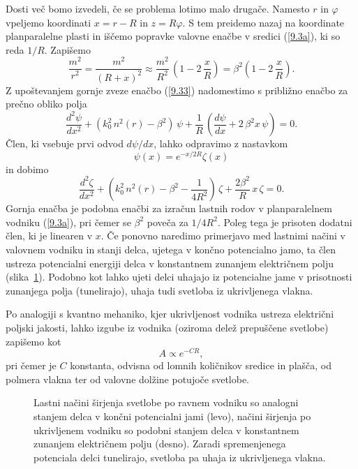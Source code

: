 Dosti več bomo izvedeli, če se problema lotimo malo drugače. Namesto $r$
in $\varphi$ vpeljemo koordinati $x=r-R$ in $z=R\varphi$.
S tem preidemo nazaj na koordinate planparalelne plasti in iščemo popravke valovne
enačbe v sredici (\ref{9.3a}), ki so reda $1/R.$ Zapišemo
\begin{equation}
\frac{m^{2}}{r^{2}}=\frac{m^{2}}{\left(R+x\right)^{2}}\approx\frac{m^{2}}
{R^{2}}\,\left(1-2\,\frac{x}{R}\right)=\beta^{2}\left(1-2\,\frac{x}{R}\right).
\label{9.34}
\end{equation}
Z upoštevanjem gornje zveze enačbo (\ref{9.33}) nadomestimo s približno enačbo za prečno obliko
polja 
\begin{equation}
\frac{d^{2}\psi}{dx^{2}}+\left(k_{0}^{2}\, n^{2}\left(r\right)-\beta^{2}\right)\,\psi+\frac{1}{R}\,
\left(\frac{d\psi}{dx}+2\,\beta^{2}x\,\psi\right)=0.
\label{9.35}
\end{equation}
Člen, ki vsebuje prvi odvod $d \psi/d x$, lahko odpravimo z nastavkom 
\begin{equation}
\psi(x) = e^{-x/2R} \zeta(x)
\end{equation}
in dobimo
\begin{equation}
\frac{d^{2}\zeta}{dx^{2}}+\left(k_{0}^{2}\, n^{2}\left(r\right)-\beta^{2}-\frac{1}{4R^2}\right)\,\zeta
+ \frac{2\beta^{2}}{R}\,x\,\zeta=0.
\label{9.35a}
\end{equation}
Gornja enačba je podobna enačbi za izračun lastnih rodov v planparalelnem
vodniku (\ref{9.3a}), pri čemer se $\beta^2$ poveča za $1/4R^2$. Poleg tega je prisoten
dodatni člen, ki je linearen v $x$. Če ponovno naredimo primerjavo
med lastnimi načini v valovnem vodniku in stanji delca, ujetega v končno potencialno jamo, 
ta člen ustreza potencialni energiji delca v konstantnem zunanjem električnem 
polju (slika~\ref{fig:tunel}). Podobno kot lahko ujeti delci uhajajo iz potencialne jame
v prisotnosti zunanjega polja (tunelirajo), uhaja tudi svetloba iz ukrivljenega vlakna.

Po analogiji s kvantno mehaniko, kjer ukrivljenost vodnika ustreza električni poljski jakosti,
lahko izgube iz vodnika (oziroma delež prepuščene svetlobe) zapišemo kot 
\begin{equation}
A \propto e^{-CR},
\end{equation}
pri čemer je $C$ konstanta, odvisna od lomnih količnikov sredice in plašča, od polmera vlakna 
ter od valovne dolžine potujoče svetlobe.
\begin{figure}[h]
\centering
\def\svgwidth{120truemm} 
 
\caption{Lastni načini širjenja svetlobe po ravnem vodniku so analogni stanjem 
delca v končni potencialni jami (levo), načini širjenja po ukrivljenem vodniku 
so podobni stanjem delca v konstantnem zunanjem električnem polju (desno). Zaradi
spremenjenega potenciala delci tunelirajo, svetloba pa uhaja iz ukrivljenega vlakna.}
\label{fig:tunel}
\end{figure}


